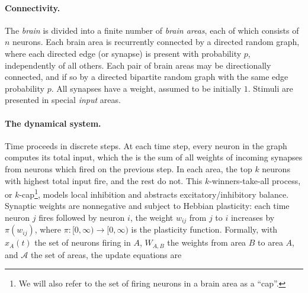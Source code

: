 \documentclass{article}
\theoremstyle{remark}
\newcommand{\1}{\mathbbm{1}}
\DeclareRobustCommand{\mitro}[1]{{\color{red} (Dan: #1)}}
\begin{document}
\paragraph{Connectivity.} The \emph{brain} is divided into a finite number of \emph{brain areas}, each of which consists of $n$ neurons. Each brain area is recurrently connected by a directed random graph, where each directed edge (or synapse) is present with probability $p$, independently of all others. Each pair of brain areas may be directionally connected, and if so by a directed bipartite random graph with the same edge probability $p$. All synapses have a weight, assumed to be initially $1$. Stimuli are presented in special \emph{input} areas.

\paragraph{The dynamical system.} Time proceeds in discrete steps. At each time step, every neuron in the graph computes its total input, which the is the sum of all weights of incoming synapses from neurons which fired on the previous step. %
In each area, the top $k$ neurons with highest total input fire, and the rest do not. This $k$-winners-take-all process, or $k$-cap\footnote{We will also refer to the set of firing neurons in a brain area as a ``cap''.}, models local inhibition and abstracts excitatory/inhibitory balance. Synaptic weights are nonnegative and subject to Hebbian plasticity: each time neuron $j$ fires followed by neuron $i$, the weight $w_{ij}$ from $j$ to $i$ increases by $\pi(w_{ij})$, where $\pi \colon [0, \infty) \to [0, \infty)$ is the plasticity function. Formally, with $x_A(t)$ the set of neurons firing in $A$, $W_{A,B}$ the weights from area $B$ to area $A$, and $\mathcal{A}$ the set of areas, the update equations are
\end{document}
